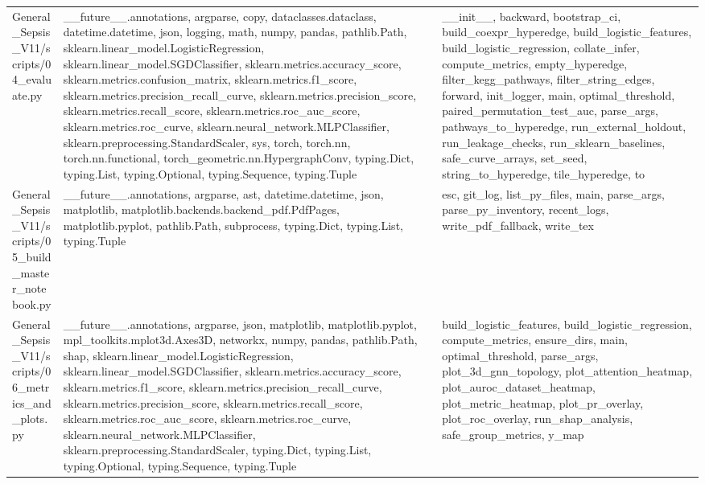 \documentclass[11pt]{article}
\begin{document}
\begin{longtable}{p{}p{}p{}}
General\_Sepsis\_V11/scripts/04\_evaluate.py & \_\_future\_\_.annotations, argparse, copy, dataclasses.dataclass, datetime.datetime, json, logging, math, numpy, pandas, pathlib.Path, sklearn.linear\_model.LogisticRegression, sklearn.linear\_model.SGDClassifier, sklearn.metrics.accuracy\_score, sklearn.metrics.confusion\_matrix, sklearn.metrics.f1\_score, sklearn.metrics.precision\_recall\_curve, sklearn.metrics.precision\_score, sklearn.metrics.recall\_score, sklearn.metrics.roc\_auc\_score, sklearn.metrics.roc\_curve, sklearn.neural\_network.MLPClassifier, sklearn.preprocessing.StandardScaler, sys, torch, torch.nn, torch.nn.functional, torch\_geometric.nn.HypergraphConv, typing.Dict, typing.List, typing.Optional, typing.Sequence, typing.Tuple & \_\_init\_\_, backward, bootstrap\_ci, build\_coexpr\_hyperedge, build\_logistic\_features, build\_logistic\_regression, collate\_infer, compute\_metrics, empty\_hyperedge, filter\_kegg\_pathways, filter\_string\_edges, forward, init\_logger, main, optimal\_threshold, paired\_permutation\_test\_auc, parse\_args, pathways\_to\_hyperedge, run\_external\_holdout, run\_leakage\_checks, run\_sklearn\_baselines, safe\_curve\_arrays, set\_seed, string\_to\_hyperedge, tile\_hyperedge, to \\
General\_Sepsis\_V11/scripts/05\_build\_master\_notebook.py & \_\_future\_\_.annotations, argparse, ast, datetime.datetime, json, matplotlib, matplotlib.backends.backend\_pdf.PdfPages, matplotlib.pyplot, pathlib.Path, subprocess, typing.Dict, typing.List, typing.Tuple & esc, git\_log, list\_py\_files, main, parse\_args, parse\_py\_inventory, recent\_logs, write\_pdf\_fallback, write\_tex \\
General\_Sepsis\_V11/scripts/06\_metrics\_and\_plots.py & \_\_future\_\_.annotations, argparse, json, matplotlib, matplotlib.pyplot, mpl\_toolkits.mplot3d.Axes3D, networkx, numpy, pandas, pathlib.Path, shap, sklearn.linear\_model.LogisticRegression, sklearn.linear\_model.SGDClassifier, sklearn.metrics.accuracy\_score, sklearn.metrics.f1\_score, sklearn.metrics.precision\_recall\_curve, sklearn.metrics.precision\_score, sklearn.metrics.recall\_score, sklearn.metrics.roc\_auc\_score, sklearn.metrics.roc\_curve, sklearn.neural\_network.MLPClassifier, sklearn.preprocessing.StandardScaler, typing.Dict, typing.List, typing.Optional, typing.Sequence, typing.Tuple & build\_logistic\_features, build\_logistic\_regression, compute\_metrics, ensure\_dirs, main, optimal\_threshold, parse\_args, plot\_3d\_gnn\_topology, plot\_attention\_heatmap, plot\_auroc\_dataset\_heatmap, plot\_metric\_heatmap, plot\_pr\_overlay, plot\_roc\_overlay, run\_shap\_analysis, safe\_group\_metrics, y\_map \\
\end{longtable}
\end{document}
